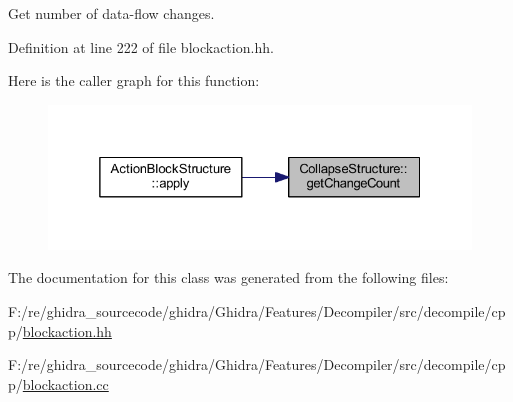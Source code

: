Get number of data-\/flow changes. 



Definition at line 222 of file blockaction.\+hh.

Here is the caller graph for this function\+:
\nopagebreak
\begin{figure}[H]
\begin{center}
\leavevmode
\includegraphics[width=325pt]{class_collapse_structure_a075bcd360eb6a82c92689fc18f1fcc1e_icgraph}
\end{center}
\end{figure}


The documentation for this class was generated from the following files\+:\begin{DoxyCompactItemize}
\item 
F\+:/re/ghidra\+\_\+sourcecode/ghidra/\+Ghidra/\+Features/\+Decompiler/src/decompile/cpp/\mbox{\hyperlink{blockaction_8hh}{blockaction.\+hh}}\item 
F\+:/re/ghidra\+\_\+sourcecode/ghidra/\+Ghidra/\+Features/\+Decompiler/src/decompile/cpp/\mbox{\hyperlink{blockaction_8cc}{blockaction.\+cc}}\end{DoxyCompactItemize}
